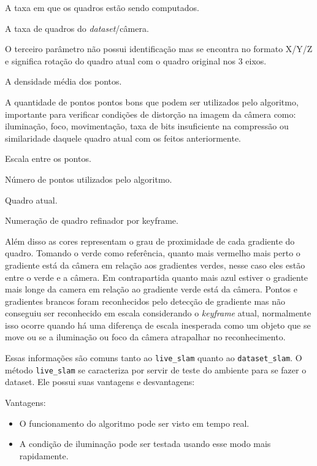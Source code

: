 \begin{description}
	\item[Map upd :]{A taxa em que os quadros estão sendo computados.}
	\item[Trk :]{A taxa de quadros do \textit{dataset}/câmera.}
	\item[X/Y/Z :]{O terceiro parâmetro não possui identificação mas se encontra no formato X/Y/Z e significa rotação do quadro atual com o quadro original nos 3 eixos.}
	\item[Dens X\% :]{A densidade média dos pontos.}
	\item[Good X\% :]{ A quantidade de pontos pontos bons que podem ser utilizados pelo algoritmo, importante para verificar condições de distorção na imagem da câmera como: iluminação, foco, movimentação, taxa de bits insuficiente na compressão ou similaridade daquele quadro atual com os feitos anteriormente.}
	\item[Scale X\% :]{Escala entre os pontos.}
	\item{Número de pontos utilizados pelo algoritmo.}
	\item{Quadro atual.}
	\item{Numeração de quadro refinador por keyframe.}
\end{description}

Além disso as cores representam o grau de proximidade de cada gradiente do quadro. Tomando o verde como referência, quanto mais vermelho mais perto o gradiente está da câmera em relação aos gradientes verdes, nesse caso eles estão entre o verde e a câmera. Em contrapartida quanto mais azul estiver o gradiente mais longe da camera em relação ao gradiente verde está da câmera. Pontos e gradientes brancos foram reconhecidos pelo detecção de gradiente mas não conseguiu ser reconhecido em escala considerando o \textit{keyframe} atual, normalmente isso ocorre quando há uma diferença de escala inesperada como um objeto que se move ou se a iluminação ou foco da câmera atrapalhar no reconhecimento.

Essas informações são comuns tanto ao \texttt{live\_slam} quanto ao \texttt{dataset\_slam}. O método \texttt{live\_slam} se caracteriza por servir de teste do ambiente para se fazer o dataset. Ele possui suas vantagens e desvantagens:

Vantagens:

\begin{itemize}
	\item{O funcionamento do algoritmo pode ser visto em tempo real.}
	\item{A condição de iluminação pode ser testada usando esse modo mais rapidamente.}
\end{itemize}

